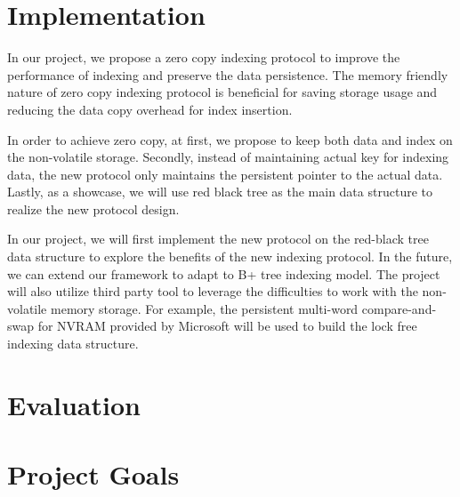 \section{Implementation}
In our project, we propose a zero copy indexing protocol to improve the performance of indexing and preserve the data persistence. The memory friendly nature of zero copy indexing protocol is beneficial for saving storage usage and reducing the data copy overhead for index insertion. 

In order to achieve zero copy, at first, we propose to keep both data and index on the non-volatile storage. Secondly, instead of maintaining actual key for indexing data, the new protocol only maintains the persistent pointer to the actual data. Lastly, as a showcase, we will use red black tree as the main data structure to realize the new protocol design.

In our project, we will first implement the new protocol on the red-black tree data structure to explore the benefits of the new indexing protocol. In the future, we can extend our framework to adapt to B+ tree indexing model. The project will also utilize third party tool to leverage the difficulties to work with the non-volatile memory storage. For example, the persistent multi-word compare-and-swap for NVRAM provided by Microsoft will be used to build the lock free indexing data structure. 

\section{Evaluation}


\section{Project Goals}
